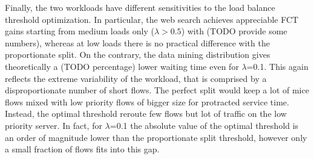 Finally, the two workloads have different sensitivities to the load balance threshold optimization. In particular, the web search achieves appreciable FCT gains starting from medium loads only ($\lambda > 0.5$) with (TODO provide some numbers), whereas at low loads there is no practical difference with the proportionate split. On the contrary, the data mining distribution gives theoretically a (TODO percentage) lower waiting time even for $\lambda$=0.1. This again reflects the extreme variability of the workload, that is comprised by a disproportionate number of short flows. The perfect split would keep a lot of mice flows mixed with low priority flows of bigger size for protracted service time. Instead, the optimal threshold reroute few flows but lot of traffic on the low priority server. In fact, for $\lambda$=0.1 the absolute value of the optimal threshold is an order of magnitude lower than the proportionate split threshold, however only a small fraction of flows fits into this gap. 

